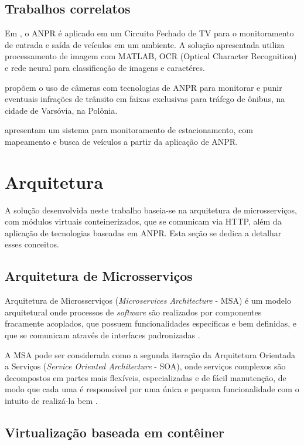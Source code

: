 \documentclass[12pt]{article}
\begin{document}
\subsection{Trabalhos correlatos}

Em , o ANPR é aplicado em um Circuito Fechado de TV para o monitoramento de entrada e saída de veículos em um ambiente. A solução apresentada utiliza processamento de imagem com MATLAB, OCR (Optical Character Recognition) e rede neural para classificação de imagens e caractéres.

 propõem o uso de câmeras com tecnologias de ANPR para monitorar e punir eventuais infrações de trânsito em faixas exclusivas para tráfego de ônibus, na cidade de Varsóvia, na Polônia.

 apresentam um sistema para monitoramento de estacionamento, com mapeamento e busca de veículos a partir da aplicação de ANPR.

\section{Arquitetura} \label{sec:architecture}

A solução desenvolvida neste trabalho baseia-se na arquitetura de microsserviços, com módulos virtuais conteinerizados, que se comunicam via HTTP, além da aplicação de tecnologias baseadas em ANPR. Esta seção se dedica a detalhar esses conceitos.

\subsection{Arquitetura de Microsserviços}

Arquitetura de Microsserviços (\textit{Microservices Architecture} - MSA) é um modelo arquitetural onde processos de \textit{software} são realizados por componentes fracamente acoplados, que possuem funcionalidades específicas e bem definidas, e que se comunicam através de interfaces padronizadas \cite{viggiato2018}.

A MSA pode ser considerada como a segunda iteração da Arquitetura Orientada a Serviços (\textit{Service Oriented Architecture} - SOA), onde serviços complexos são decompostos em partes mais flexíveis, especializadas e de fácil manutenção, de modo que cada uma é responsável por uma única e pequena funcionalidade com o intuito de realizá-la bem \cite{homay2019}. 

\subsection{Virtualização baseada em contêiner}
\end{document}
